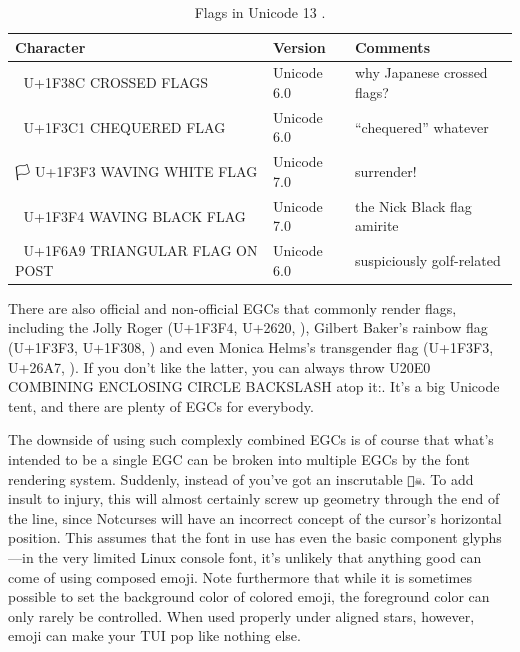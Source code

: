 \documentclass[letterpaper,10pt]{article}
\begin{document}
\begin{table}[!htb]
  \centering
  \begin{tabular}{|l|l|l|}
  \hline
  Character & Version & Comments \\
  \hline
  \hline
  🎌 U+1F38C CROSSED FLAGS & Unicode 6.0 & why Japanese crossed flags? \\
  \hline
  🏁 U+1F3C1 CHEQUERED FLAG & Unicode 6.0 & ``chequered'' whatever \\
  \hline
  🏳 U+1F3F3 WAVING WHITE FLAG & Unicode 7.0 & surrender! \\
  \hline
  🏴  U+1F3F4 WAVING BLACK FLAG & Unicode 7.0 & the Nick Black flag amirite \\
  \hline
  🚩 U+1F6A9 TRIANGULAR FLAG ON POST & Unicode 6.0 & suspiciously golf-related \\
  \hline
  \end{tabular}
  \caption{Flags in Unicode 13 .}
  \label{table:flags}
\end{table}

There are also official and non-official EGCs that commonly render flags, including
the Jolly Roger (U+1F3F4, U+2620, ),
Gilbert Baker's rainbow flag (U+1F3F3, U+1F308, ) and even Monica Helms's
transgender flag (U+1F3F3, U+26A7, ).
If you don't like the latter, you can always throw U20E0 COMBINING ENCLOSING
CIRCLE BACKSLASH atop it:. It's a big Unicode tent, and there are plenty
of EGCs for everybody.

The downside of using such complexly combined EGCs is of course that what's
intended to be a single EGC can be broken into multiple EGCs by the font
rendering system. Suddenly, instead of 
you've got an inscrutable \texttt{🏴☠}. To add insult to injury, this will
almost certainly screw up geometry through the end of the line, since Notcurses
will have an incorrect concept of the cursor's horizontal position. This
assumes that the font in use has even the basic component glyphs---in the very
limited Linux console font, it's unlikely that anything good can come of using
composed emoji. Note furthermore that while it is sometimes possible to set the
background color of colored emoji, the foreground color can only rarely be
controlled. When used properly under aligned stars, however, emoji can make
your TUI pop like nothing else.
\end{document}
